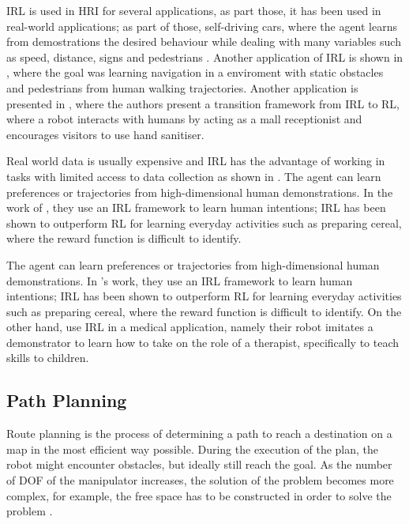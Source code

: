 \documentclass[thesis]{mas_proposal}
\begin{document}
    IRL is used in HRI for several applications, as part those, it has been used in real-world applications; as part of those, self-driving cars, where the agent learns from demostrations the desired behaviour while dealing with many variables such as speed, distance, signs and pedestrians \cite{Arora2021} . Another application of IRL is shown in \cite{Kretzschmar2016}, where the goal was learning navigation in a enviroment with static obstacles and pedestrians from human walking trajectories. Another application is presented in \cite{Chen2023}, where the authors present a transition framework from IRL to RL, where a robot interacts with humans by acting as a mall receptionist and encourages visitors to use hand sanitiser. 
    
    Real world data is usually expensive and IRL has the advantage of working in tasks with limited access to data collection as shown in \cite{Chen2023}. The agent can learn preferences or trajectories from high-dimensional human demonstrations. In the work of \cite{Bhattacharyya2020}, they use an IRL framework to learn human intentions; IRL has been shown to outperform RL for learning everyday activities such as preparing cereal, where the reward function is difficult to identify. 
    
    The agent can learn preferences or trajectories from high-dimensional human demonstrations. In \cite{Bhattacharyya2020}'s work, they use an IRL framework to learn human intentions; IRL has been shown to outperform RL for learning everyday activities such as preparing cereal, where the reward function is difficult to identify. On the other hand, \cite{Hussein2019} use IRL in a medical application, namely their robot imitates a demonstrator to learn how to take on the role of a therapist, specifically to teach skills to children.  
    
    \subsection{Path Planning}
    
    Route planning is the process of determining a path to reach a destination on a map in the most efficient way possible. During the execution of the plan, the robot might encounter obstacles, but ideally still reach the goal. As the number of DOF of the manipulator increases, the solution of the problem becomes more complex, for example, the free space has to be constructed in order to solve the problem \cite{Siegwart2011}. 
    
\end{document}
